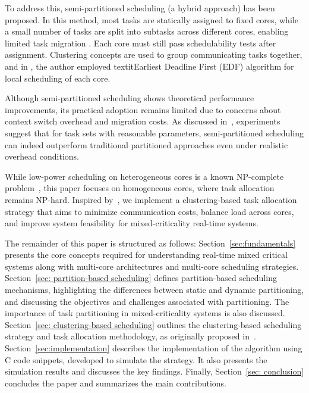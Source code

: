 \documentclass[conference]{IEEEtran}
\begin{document}
To address this, semi-partitioned scheduling (a hybrid approach) has been proposed. In this method, most tasks are statically assigned to fixed cores, while a small number of tasks are split into subtasks across different cores, enabling limited task migration \cite{AbdallahGB24}. Each core must still pass schedulability tests after assignment. Clustering concepts are used to group communicating tasks together, and in \cite{AbdallahGB24}, the author employed textit{Earliest Deadline First (EDF)} algorithm for local scheduling of each core.

Although semi-partitioned scheduling shows theoretical performance improvements, its practical adoption remains limited due to concerns about context switch overhead and migration costs. As discussed in~\cite{5953668}, experiments suggest that for task sets with reasonable parameters, semi-partitioned scheduling can indeed outperform traditional partitioned approaches even under realistic overhead conditions.

While low-power scheduling on heterogeneous cores is a known NP-complete problem~\cite{7832222}, this paper focuses on homogeneous cores, where task allocation remains NP-hard. Inspired by~\cite{AbdallahGB24}, we implement a clustering-based task allocation strategy that aims to minimize communication costs, balance load across cores, and improve system feasibility for mixed-criticality real-time systems.

The remainder of this paper is structured as follows: 
Section~\ref{sec:fundamentals} presents the core concepts required for understanding real-time mixed critical systems along with multi-core architectures and multi-core scheduling strategies.
Section~\ref{sec: partition-based scheduling} defines partition-based scheduling mechanisms, highlighting the differences between static and dynamic partitioning, and discussing the objectives and challenges associated with partitioning. The importance of task partitioning in mixed-criticality systems is also discussed. 
Section~\ref{sec: clustering-based scheduling} outlines the clustering-based scheduling strategy and task allocation methodology, as originally proposed in~\cite{AbdallahGB24}. 
Section~\ref{sec:implementation} describes the implementation of the algorithm using C code snippets, developed to simulate the strategy. It also presents the simulation results and discusses the key findings. 
Finally, Section~\ref{sec: conclusion} concludes the paper and summarizes the main contributions.
\end{document}
